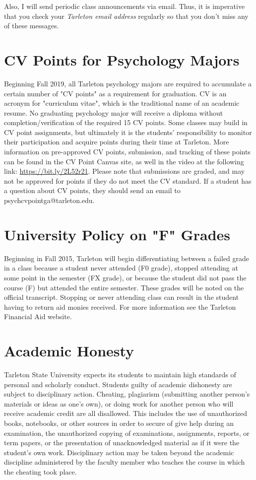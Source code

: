 \documentclass[10pt]{article}
\begin{document}
Also, I will send periodic class announcements via email.  Thus, it is imperative that you check your \emph{Tarleton email address} regularly so that you don't miss any of these messages.

\section*{CV Points for Psychology Majors}
\label{sec:orge71df4d}
Beginning Fall 2019, all Tarleton psychology majors are required to accumulate a certain number of "CV points" as a requirement for graduation. CV is an acronym for "curriculum vitae", which is the traditional name of an academic resume.  No graduating psychology major will receive a diploma without completion/verification of the required 15 CV points. Some classes may build in CV point assignments, but ultimately it is the students’ responsibility to monitor their participation and acquire points during their time at Tarleton.  More information on pre-approved CV points, submission, and tracking of these points can be found in the CV Point Canvas site, as well in the video at the following link: \url{https://bit.ly/2L52r21}. Please note that submissions are graded, and may not be approved for points if they do not meet the CV standard.  If a student has a question about CV points, they should send an email to psychcvpointga@tarleton.edu.

\section*{University Policy on "F" Grades}
\label{sec:org22c6032}
Beginning in Fall 2015, Tarleton will begin differentiating between a failed grade in a class because a student never attended (F0 grade), stopped attending at some point in the semester (FX grade), or because the student did not pass the course (F) but attended the entire semester. These grades will be noted on the official transcript. Stopping or never attending class can result in the student having to return aid monies received.  For more information see the Tarleton Financial Aid website.

\section*{Academic Honesty}
\label{sec:org6ff426e}

Tarleton State University expects its students to maintain high standards of personal and scholarly conduct. Students guilty of academic dishonesty are subject to disciplinary action. Cheating, plagiarism (submitting another person’s materials or ideas as one’s own), or doing work for another person who will receive academic credit are all disallowed. This includes the use of unauthorized books, notebooks, or other sources in order to secure of give help during an examination, the unauthorized copying of examinations, assignments, reports, or term papers, or the presentation of unacknowledged material as if it were the student’s own work. Disciplinary action may be taken beyond the academic discipline administered by the faculty member who teaches the course in which the cheating took place.
\end{document}
